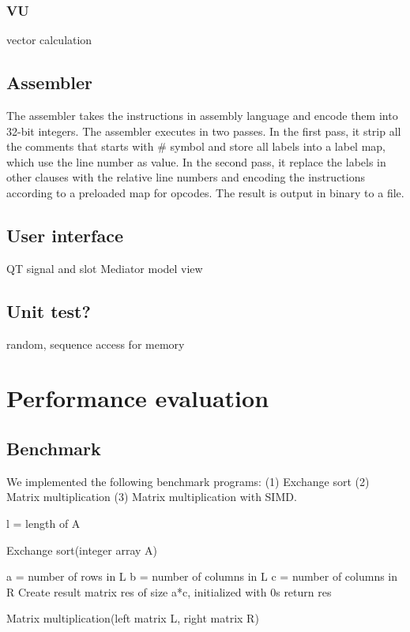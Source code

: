 \documentclass{sig-alternate}
\begin{document}
\subsubsection{VU}
vector calculation

\subsection{Assembler }
The assembler takes the instructions in assembly language and encode them into 32-bit integers. The assembler executes in two passes. In the first pass, it strip all the comments that starts with $\#$ symbol and store all labels into a label map, which use the line number as value. In the second pass, it replace the labels in other clauses with the relative line numbers and encoding the instructions according to a preloaded map for opcodes. The result is output in binary to a file. 

\subsection{User interface}
QT signal and slot
Mediator
model view 

\subsection{Unit test?} 
random, sequence access for memory

\section{Performance evaluation}
\subsection{Benchmark}
We implemented the following benchmark programs: (1) Exchange sort (2) Matrix multiplication (3) Matrix multiplication with SIMD.
\begin{algorithm}[]
\SetAlgoLined
 l = length of A\;
 \caption{Exchange sort(integer array A)}
\end{algorithm}

\begin{algorithm}[]
\SetAlgoLined
 a = number of rows in L\;
 b = number of columns in L\;
 c = number of columns in R\;
 Create result matrix res of size a*c, initialized with 0s\;
 return res\;
 \caption{Matrix multiplication(left matrix L, right matrix R)}
\end{algorithm}
\end{document}
